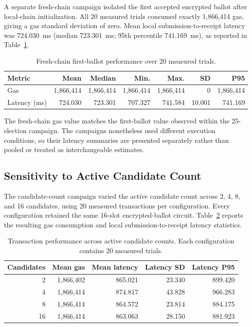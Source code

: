 \label{subsec:results-fresh-chain}
A separate fresh-chain campaign isolated the first accepted encrypted ballot after local-chain initialization. All 20 measured trials consumed exactly 1,866,414 gas, giving a gas standard deviation of zero. Mean local submission-to-receipt latency was 724.030~ms (median 723.301~ms; 95th percentile 741.169~ms), as reported in Table~\ref{tab:results-fresh-chain}.

\begin{table}[t]
\centering
\caption{Fresh-chain first-ballot performance
over 20 measured trials.}
\label{tab:results-fresh-chain}
\scriptsize
\setlength{\tabcolsep}{3pt}
\begin{tabular}{@{}lrrrrrr@{}}
\toprule
\textbf{Metric} &
\textbf{Mean} &
\textbf{Median} &
\textbf{Min.} &
\textbf{Max.} &
\textbf{SD} &
\textbf{P95} \\
\midrule
Gas
& 1,866,414
& 1,866,414
& 1,866,414
& 1,866,414
& 0
& 1,866,414 \\
Latency (ms)
& 724.030
& 723.301
& 707.327
& 741.584
& 10.001
& 741.169 \\
\bottomrule
\end{tabular}
\end{table}

The fresh-chain gas value matches the first-ballot value observed within the 25-election campaign. The campaigns nonetheless used different execution conditions, so their latency summaries are presented separately rather than pooled or treated as interchangeable estimates.

\subsection{Sensitivity to Active Candidate Count}
\label{subsec:results-candidate-count}

The candidate-count campaign varied the active candidate count across 2, 4, 8, and 16 candidates, using 20 measured transactions per configuration. Every configuration retained the same 16-slot encrypted-ballot circuit. Table~\ref{tab:results-candidate-count} reports the resulting gas consumption and local submission-to-receipt latency statistics.

\begin{table}[t]
\centering
\caption{Transaction performance across active
candidate counts. Each configuration contains
20 measured trials.}
\label{tab:results-candidate-count}
\small
\setlength{\tabcolsep}{4pt}
\begin{tabular}{@{}rrrrr@{}}
\toprule
\textbf{Candidates} &
\textbf{Mean gas} &
\textbf{Mean latency} &
\textbf{Latency SD} &
\textbf{Latency P95} \\
\midrule
2  & 1,866,402 & 865.021 & 23.340 & 899.420 \\
4  & 1,866,414 & 874.817 & 43.828 & 966.283 \\
8  & 1,866,414 & 864.572 & 23.814 & 884.175 \\
16 & 1,866,414 & 863.063 & 28.150 & 881.923 \\
\bottomrule
\end{tabular}
\end{table}

